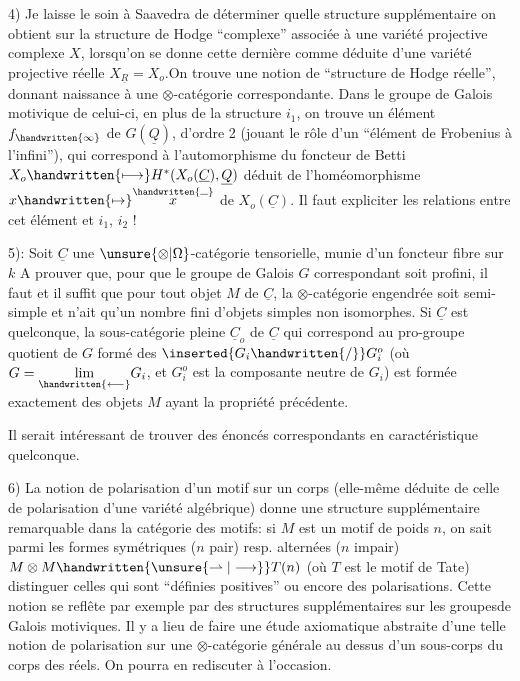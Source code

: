 4) Je laisse le soin à Saavedra de déterminer quelle structure supplémentaire on obtient sur la structure de Hodge ``complexe'' associée à une variété projective  complexe $X$, lorsqu'on se donne cette dernière comme déduite d'une variété projective réelle $X_{\underline{R}}=X_o$.On trouve une notion de ``structure de Hodge réelle'', donnant naissance à une $\otimes$-catégorie correspondante. Dans le groupe de Galois motivique de celui-ci, en plus de la structure $i_1$, on trouve un élément $f_{\handwritten{\infty}}$ de $G(\underline{Q})$,  d'ordre 2 (jouant le rôle d'un ``élément de Frobenius à l'infini''), qui correspond à l'automorphisme du foncteur de Betti $X_o\handwritten{\longmapsto} H^*(X_o(\underline{C}),\underline{Q})$ déduit de l'homéomorphisme $x\handwritten{\mapsto}\overset{\handwritten{\rule{.55em}{.35pt}}}{x}$ de $X_o(\underline{C})$. Il faut expliciter les relations entre cet élément et $i_1$, $i_2$ !

5): Soit $\underline{C}$ une $\unsure{\otimes|\Omega}$-catégorie tensorielle,  munie d'un foncteur fibre sur $k$  A prouver que, pour que le groupe de Galois $G$ correspondant soit profini, il faut et il suffit que pour tout objet $M$ de $\underline{C}$, la $\otimes$-catégorie engendrée soit semi-simple et n'ait qu'un nombre fini d'objets simples non isomorphes. Si $\underline{C}$ est quelconque, la sous-catégorie pleine  $\underline{C}_o$ de $\underline{C}$ qui correspond au pro-groupe quotient de $G$ formé des $\inserted{G_i\handwritten{/}}G_i^o$ (où $G=\underset{\handwritten{\longleftarrow}}{\lim}G_i$, et $G_i^o$ est la composante neutre de $G_i$) est formée exactement des objets $M$ ayant la propriété précédente.

Il serait intéressant de trouver des énoncés correspondants en caractéristique quelconque.

6) La notion de polarisation d'un motif sur un corps (elle-même déduite de celle de polarisation d'une variété algébrique) donne une structure supplémentaire remarquable dans la catégorie des motifs: si $M$ est un motif de poids $n$, on sait parmi les formes symétriques ($n$ pair) resp. alternées ($n$ impair) $M\otimes M\handwritten{\unsure{\rightharpoonup|\longrightarrow}} T(n)$ (où $T$ est le motif de Tate) distinguer celles qui sont ``définies positives'' ou encore des polarisations. Cette notion se reflête par exemple par des structures supplémentaires sur les groupesde Galois motiviques. Il y a lieu de faire une étude axiomatique abstraite d'une telle notion de polarisation sur une $\otimes$-catégorie générale au dessus d'un  sous-corps du corps des réels. On pourra en rediscuter à l'occasion.
